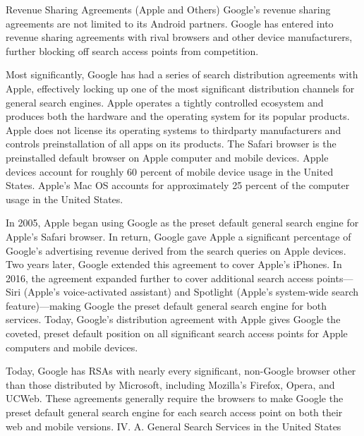 \documentclass[11pt,b5paper]{scrartcl}
\begin{document}



Revenue Sharing Agreements (Apple and Others)
Google’s revenue sharing agreements are not limited to its Android partners.
Google has entered into revenue sharing agreements with rival browsers and other device
manufacturers, further blocking off search access points from competition.


Most significantly, Google has had a series of search distribution agreements with
Apple, effectively locking up one of the most significant distribution channels for general search
engines. Apple operates a tightly controlled ecosystem and produces both the hardware and the
operating system for its popular products. Apple does not license its operating systems to thirdparty manufacturers and controls preinstallation of all apps on its products. The Safari browser is
the preinstalled default browser on Apple computer and mobile devices. Apple devices account
for roughly 60 percent of mobile device usage in the United States. Apple’s Mac OS accounts for
approximately 25 percent of the computer usage in the United States.


In 2005, Apple began using Google as the preset default general search engine for
Apple’s Safari browser. In return, Google gave Apple a significant percentage of Google’s
advertising revenue derived from the search queries on Apple devices. Two years later, Google
extended this agreement to cover Apple’s iPhones. In 2016, the agreement expanded further to
cover additional search access points—Siri (Apple’s voice-activated assistant) and Spotlight
(Apple’s system-wide search feature)—making Google the preset default general search engine
for both services. Today, Google’s distribution agreement with Apple gives Google the coveted,
preset default position on all significant search access points for Apple computers and mobile
devices.


Today, Google has RSAs with nearly every significant, non-Google browser other
than those distributed by Microsoft, including Mozilla’s Firefox, Opera, and UCWeb. These
agreements generally require the browsers to make Google the preset default general search
engine for each search access point on both their web and mobile versions.
IV.
A.
General Search Services in the United States
\end{document}
